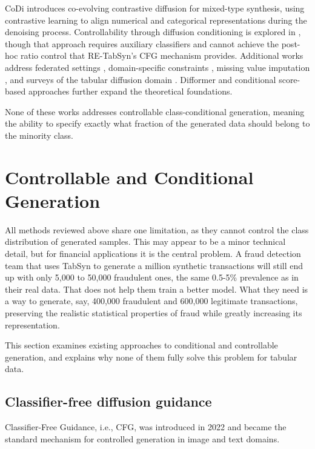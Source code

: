 CoDi \cite{choi2023codi} introduces co-evolving contrastive diffusion for mixed-type synthesis, using contrastive learning to align numerical and categorical representations during the denoising process. Controllability through diffusion conditioning is explored in \cite{zheng2024controllable}, though that approach requires auxiliary classifiers and cannot achieve the post-hoc ratio control that RE-TabSyn's CFG mechanism provides. Additional works address federated settings \cite{noble2024dpfed, sattarov2024fedtabdiff, yang2024feddiff, shankar2024silofuse}, domain-specific constraints \cite{yuan2024domain}, missing value imputation \cite{ouyang2023missdiff, jolicoeurmartineau2024diffusion}, and surveys of the tabular diffusion domain \cite{mueller2024diffusion}. Difformer \cite{wu2023difformer} and conditional score-based approaches \cite{baldassari2024conditional} further expand the theoretical foundations.

None of these works addresses controllable class-conditional generation, meaning the ability to specify exactly what fraction of the generated data should belong to the minority class.

\section{Controllable and Conditional Generation}

All methods reviewed above share one limitation, as they cannot control the class distribution of generated samples. This may appear to be a minor technical detail, but for financial applications it is the central problem. A fraud detection team that uses TabSyn to generate a million synthetic transactions will still end up with only 5,000 to 50,000 fraudulent ones, the same 0.5-5\% prevalence as in their real data. That does not help them train a better model. What they need is a way to generate, say, 400,000 fraudulent and 600,000 legitimate transactions, preserving the realistic statistical properties of fraud while greatly increasing its representation.

This section examines existing approaches to conditional and controllable generation, and explains why none of them fully solve this problem for tabular data.

\subsection{Classifier-free diffusion guidance}

Classifier-Free Guidance, i.e., CFG, was introduced in 2022 \cite{ho2022cfg} and became the standard mechanism for controlled generation in image and text domains.

